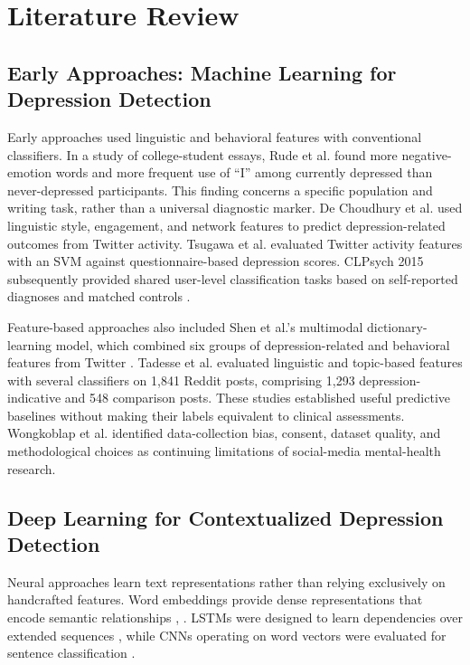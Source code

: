 \documentclass{ieeeaccess}
\begin{document}
\section{Literature Review}

\subsection{Early Approaches: Machine Learning for Depression Detection}

Early approaches used linguistic and behavioral features with conventional classifiers. In a study of college-student essays, Rude et al. \cite{ref20} found more negative-emotion words and more frequent use of ``I'' among currently depressed than never-depressed participants. This finding concerns a specific population and writing task, rather than a universal diagnostic marker. De Choudhury et al. \cite{ref21} used linguistic style, engagement, and network features to predict depression-related outcomes from Twitter activity. Tsugawa et al. \cite{ref22} evaluated Twitter activity features with an SVM against questionnaire-based depression scores. CLPsych 2015 subsequently provided shared user-level classification tasks based on self-reported diagnoses and matched controls \cite{ref23}.

Feature-based approaches also included Shen et al.'s multimodal dictionary-learning model, which combined six groups of depression-related and behavioral features from Twitter \cite{ref29}. Tadesse et al. \cite{ref31} evaluated linguistic and topic-based features with several classifiers on 1,841 Reddit posts, comprising 1,293 depression-indicative and 548 comparison posts. These studies established useful predictive baselines without making their labels equivalent to clinical assessments. Wongkoblap et al. \cite{ref24} identified data-collection bias, consent, dataset quality, and methodological choices as continuing limitations of social-media mental-health research.

\subsection{Deep Learning for Contextualized Depression Detection}

Neural approaches learn text representations rather than relying exclusively on handcrafted features. Word embeddings provide dense representations that encode semantic relationships \cite{ref25}, \cite{ref26}. LSTMs were designed to learn dependencies over extended sequences \cite{ref27}, while CNNs operating on word vectors were evaluated for sentence classification \cite{ref28}.
\end{document}
